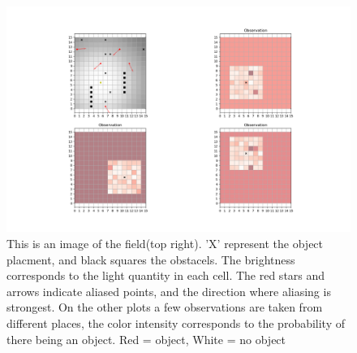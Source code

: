 \documentclass{article}
\begin{document}
	\begin{figure}[t]
		\centering
		\includegraphics[width=0.7\linewidth, height=0.3\textheight]{../figures/exploring_field}
		\caption[Exploring the field]{This is an image of the field(top right). 'X' represent the object placment, and black squares the obstacels. The brightness corresponds to the light quantity in each cell. The red stars and arrows indicate aliased points, and the direction where aliasing is strongest. On the other plots a few observations are taken from different places, the color intensity corresponds to the probability of there being an object. Red = object, White = no object}
		\label{fig:exploringfield}
	\end{figure}
\end{document}
